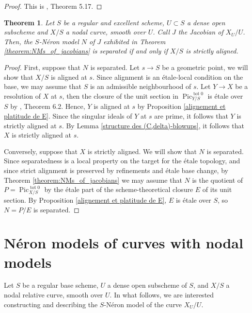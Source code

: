 \documentclass[a4paper,10pt,twoside]{article}
\newcommand{\on}[1]{\operatorname{#1}}
\DeclareMathOperator{\pic}{Pic}
\newtheorem{thm}{Theorem}[section]
\theoremstyle{definition}
\theoremstyle{remark}
\renewcommand{\on}[1]{\operatorname{#1}}
\begin{document}
\begin{proof}
	This is \cite{Holmes}, Theorem 5.17.
\end{proof}

\begin{thm}\label{theorem:separatedness_of_NM_jac_iff_strictly_aligned}
Let $S$ be a regular and excellent scheme, $U\subset S$ a dense open subscheme and $X/S$ a nodal curve, smooth over $U$. Call $J$ the Jacobian of $X_U/U$. Then, the $S$-Néron model $N$ of $J$ exhibited in Theorem \ref{theorem:NMs_of_jacobians} is separated if and only if $X/S$ is strictly aligned.
\end{thm}

\begin{proof}
First, suppose that $N$ is separated. Let $s \to S$ be a geometric point, we will show that $X/S$ is aligned at $s$. Since alignment is an étale-local condition on the base, we may assume that $S$ is an admissible neighbourhood of $s$. Let $Y \to X$ be a resolution of $X$ at $s$, then the closure of the unit section in $\pic^{\on{tot}0}_{Y/S}$ is étale over $S$ by \cite{Holmes}, Theorem 6.2. Hence, $Y$ is aligned at $s$ by Proposition \ref{alignement et platitude de E}. Since the singular ideals of $Y$ at $s$ are prime, it follows that $Y$ is strictly aligned at $s$. By Lemma \ref{structure des (C,delta)-blowups}, it follows that $X$ is strictly aligned at $s$.

Conversely, suppose that $X$ is strictly aligned. We will show that $N$ is separated. Since separatedness is a local property on the target for the étale topology, and since strict alignment is preserved by refinements and étale base change, by Theorem \ref{theorem:NMs_of_jacobians} we may assume that $N$ is the quotient of $P=\pic^{\on{tot}0}_{X/S}$ by the étale part of the scheme-theoretical closure $E$ of its unit section. By Proposition \ref{alignement et platitude de E}, $E$ is étale over $S$, so $N=P/E$ is separated.
\end{proof}




\section{N\'eron models of curves with nodal models}\label{NMs_of_curves_with_nodal_models}

Let $S$ be a regular base scheme, $U$ a dense open subscheme of $S$, and $X/S$ a nodal relative curve, smooth over $U$. In what follows, we are interested constructing and describing the $S$-Néron model of the curve $X_U/U$. 
	
\end{document}
